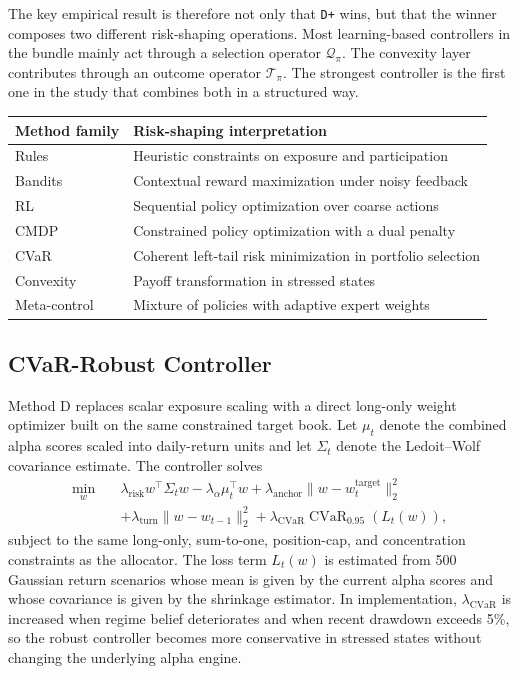 \documentclass[11pt]{article}
\begin{document}
The key empirical result is therefore not only that \texttt{D+} wins, but that the winner composes two different risk-shaping operations. Most learning-based controllers in the bundle mainly act through a selection operator $\mathcal{Q}_\pi$. The convexity layer contributes through an outcome operator $\mathcal{T}_\pi$. The strongest controller is the first one in the study that combines both in a structured way.

\begin{center}
\small
\begin{tabular}{@{} l l @{}}
\toprule
\textbf{Method family} & \textbf{Risk-shaping interpretation} \\
\midrule
Rules & Heuristic constraints on exposure and participation \\
Bandits & Contextual reward maximization under noisy feedback \\
RL & Sequential policy optimization over coarse actions \\
CMDP & Constrained policy optimization with a dual penalty \\
CVaR & Coherent left-tail risk minimization in portfolio selection \\
Convexity & Payoff transformation in stressed states \\
Meta-control & Mixture of policies with adaptive expert weights \\
\bottomrule
\end{tabular}
\end{center}

\subsection{CVaR-Robust Controller}

Method D replaces scalar exposure scaling with a direct long-only weight
optimizer built on the same constrained target book. Let $\mu_t$ denote the
combined alpha scores scaled into daily-return units and let $\Sigma_t$ denote
the Ledoit--Wolf covariance estimate. The controller solves
\begin{align*}
\min_w \quad &
\lambda_{\mathrm{risk}} w^\top \Sigma_t w
- \lambda_{\alpha}\mu_t^\top w
+ \lambda_{\mathrm{anchor}}\lVert w-w_t^{\mathrm{target}} \rVert_2^2
\\
&+ \lambda_{\mathrm{turn}}\lVert w-w_{t-1} \rVert_2^2
+ \lambda_{\mathrm{CVaR}} \operatorname{CVaR}_{0.95}(L_t(w)),
\end{align*}
subject to the same long-only, sum-to-one, position-cap, and concentration
constraints as the allocator. The loss term $L_t(w)$ is estimated from 500
Gaussian return scenarios whose mean is given by the current alpha scores and
whose covariance is given by the shrinkage estimator. In implementation,
$\lambda_{\mathrm{CVaR}}$ is increased when regime belief deteriorates and when
recent drawdown exceeds 5\%, so the robust controller becomes more conservative
in stressed states without changing the underlying alpha engine.
\end{document}

